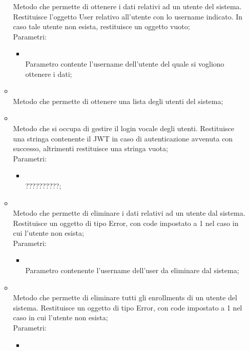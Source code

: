 \begin{itemize}
\begin{itemize}
		Metodo che permette di ottenere i dati relativi ad un utente del sistema. Restituisce l'oggetto User relativo all'utente con lo username indicato. In caso tale utente non esista, restituisce un oggetto vuoto;\\
		Parametri:
		\begin{itemize}
			\item {} \\
			Parametro contente l'username dell'utente del quale si vogliono ottenere i dati;
		\end{itemize}
		\item[]  \\
		Metodo che permette di ottenere una lista degli utenti del sistema;\\
		\item[]  \\
		Metodo che si occupa di gestire il login vocale degli utenti. Restituisce una stringa contenente il JWT in caso di autenticazione avvenuta con successo, altrimenti restituisce una stringa vuota;\\
		Parametri:
		\begin{itemize}
			\item {} \\
			??????????;
		\end{itemize}
		\item[]  \\
		Metodo che permette di eliminare i dati relativi ad un utente dal sistema. Restituisce un oggetto di tipo Error, con code impostato a 1 nel caso in cui l'utente non esista;\\
		Parametri:
		\begin{itemize}
			\item {} \\
			Parametro contenente l'username dell'user da eliminare dal sistema;
		\end{itemize}
		\item[]  \\
		Metodo che permette di eliminare tutti gli enrollments di un utente del sistema. Restituisce un oggetto di tipo Error, con code impostato a 1 nel caso in cui l'utente non esista;\\
		Parametri:
		\begin{itemize}
			\item {} \\

\end{itemize}
\end{itemize}
\end{itemize}
